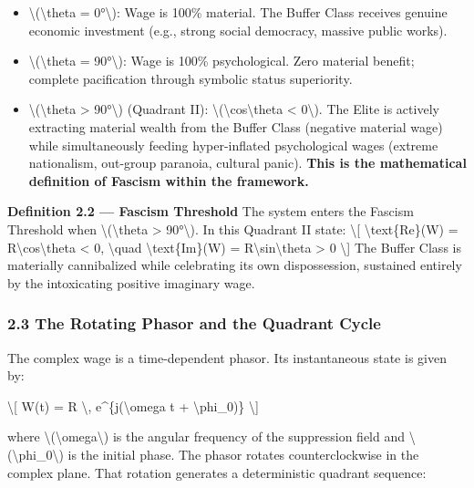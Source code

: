 \begin{itemize}
\tightlist
\item
  \textbackslash(\textbackslash theta = 0°\textbackslash): Wage is 100\%
  material. The Buffer Class receives genuine economic investment (e.g.,
  strong social democracy, massive public works).
\item
  \textbackslash(\textbackslash theta = 90°\textbackslash): Wage is
  100\% psychological. Zero material benefit; complete pacification
  through symbolic status superiority.
\item
  \textbackslash(\textbackslash theta \textgreater{} 90°\textbackslash)
  (Quadrant II): \textbackslash(\textbackslash cos\textbackslash theta
  \textless{} 0\textbackslash). The Elite is actively extracting
  material wealth from the Buffer Class (negative material wage) while
  simultaneously feeding hyper-inflated psychological wages (extreme
  nationalism, out-group paranoia, cultural panic). \textbf{This is the
  mathematical definition of Fascism within the framework.}
\end{itemize}

\textbf{Definition 2.2 --- Fascism Threshold} The system enters the
Fascism Threshold when \textbackslash(\textbackslash theta
\textgreater{} 90°\textbackslash). In this Quadrant II state:
\textbackslash{[} \textbackslash text\{Re\}(W) =
R\textbackslash cos\textbackslash theta \textless{} 0,
\textbackslash quad \textbackslash text\{Im\}(W) =
R\textbackslash sin\textbackslash theta \textgreater{} 0
\textbackslash{]} The Buffer Class is materially cannibalized while
celebrating its own dispossession, sustained entirely by the
intoxicating positive imaginary wage.

\subsubsection{2.3 The Rotating Phasor and the Quadrant
Cycle}\label{the-rotating-phasor-and-the-quadrant-cycle}

The complex wage is a time-dependent phasor. Its instantaneous state is
given by:

\textbackslash{[} W(t) = R \textbackslash, e\^{}\{j(\textbackslash omega
t + \textbackslash phi\_0)\} \textbackslash{]}

where \textbackslash(\textbackslash omega\textbackslash) is the angular
frequency of the suppression field and
\textbackslash(\textbackslash phi\_0\textbackslash) is the initial phase.
The phasor rotates counterclockwise in the complex plane. That rotation
generates a deterministic quadrant sequence:


